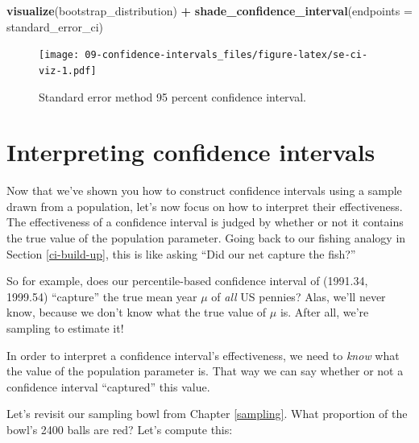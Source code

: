 \documentclass[
]{book}
\newenvironment{Shaded}{\begin{snugshade}}{\end{snugshade}}
\newcommand{\DataTypeTok}[1]{\textcolor[rgb]{0.13,0.29,0.53}{#1}}
\newcommand{\KeywordTok}[1]{\textcolor[rgb]{0.13,0.29,0.53}{\textbf{#1}}}
\newcommand{\NormalTok}[1]{#1}
\newcommand{\OperatorTok}[1]{\textcolor[rgb]{0.81,0.36,0.00}{\textbf{#1}}}
\newcommand{\StringTok}[1]{\textcolor[rgb]{0.31,0.60,0.02}{#1}}
\begin{document}
\begin{Shaded}
\begin{Highlighting}[]
\KeywordTok{visualize}\NormalTok{(bootstrap_distribution) }\OperatorTok{+}\StringTok{ }
\StringTok{  }\KeywordTok{shade_confidence_interval}\NormalTok{(}\DataTypeTok{endpoints =}\NormalTok{ standard_error_ci)}
\end{Highlighting}
\end{Shaded}

\begin{figure}
\centering
\texttt{[image: 09-confidence-intervals\_files/figure-latex/se-ci-viz-1.pdf]}
\caption{\label{fig:se-ci-viz}Standard error method 95 percent confidence interval.}
\end{figure}

\hypertarget{one-prop-ci}{%
\section{Interpreting confidence intervals}\label{one-prop-ci}}

Now that we've shown you how to construct confidence intervals using a sample drawn from a population, let's now focus on how to interpret their effectiveness. The effectiveness of a confidence interval is judged by whether or not it contains the true value of the population parameter. Going back to our fishing analogy in Section \ref{ci-build-up}, this is like asking ``Did our net capture the fish?''

So for example, does our percentile-based confidence interval of (1991.34, 1999.54) ``capture'' the true mean year \(\mu\) of \emph{all} US pennies? Alas, we'll never know, because we don't know what the true value of \(\mu\) is. After all, we're sampling to estimate it!

In order to interpret a confidence interval's effectiveness, we need to \emph{know} what the value of the population parameter is. That way we can say whether or not a confidence interval ``captured'' this value.

Let's revisit our sampling bowl from Chapter \ref{sampling}. What proportion of the bowl's 2400 balls are red? Let's compute this:

\begin{Shaded}
\end{Shaded}
\end{document}

